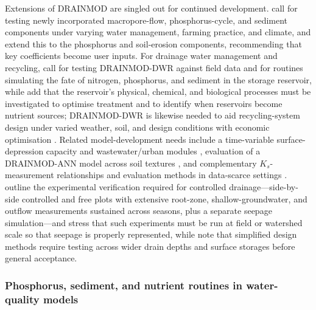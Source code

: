 \documentclass[11pt]{article}
\begin{document}
Extensions of DRAINMOD are singled out for continued development.
\textcite{Askar2021b} call for testing newly incorporated
macropore-flow, phosphorus-cycle, and sediment components under varying water
management, farming practice, and climate, and \textcite{Askar2025} extend this
to the phosphorus and soil-erosion components, recommending that key
coefficients become user inputs. For drainage water management and recycling,
\textcite{Moursi2022} call for testing DRAINMOD-DWR against field data and for
routines simulating the fate of nitrogen, phosphorus, and sediment in the
storage reservoir, while \textcite{Moursi2023} add that the reservoir's
physical, chemical, and biological processes must be investigated to optimise
treatment and to identify when reservoirs become nutrient sources; DRAINMOD-DWR
is likewise needed to aid recycling-system design under varied weather, soil,
and design conditions with economic optimisation \parencite{Moursi2024}. Related
model-development needs include a time-variable surface-depression capacity and
wastewater/urban modules \parencite{Abduljaleel2023}, evaluation of a
DRAINMOD-ANN model across soil textures \parencite{Awad2022}, and complementary
$K_s$-measurement relationships and evaluation methods in data-scarce settings
\parencite{NabiSichani2012,Salazar2008}. \textcite{Youssef2018} outline the
experimental verification required for controlled drainage---side-by-side
controlled and free plots with extensive root-zone, shallow-groundwater, and
outflow measurements sustained across seasons, plus a separate seepage
simulation---and \textcite{Skaggs2010} stress that such experiments must be run
at field or watershed scale so that seepage is properly represented, while
\textcite{Skaggs2006} note that simplified design methods require testing across
wider drain depths and surface storages before general acceptance.

\subsubsection{Phosphorus, sediment, and nutrient routines in water-quality models}
\end{document}
